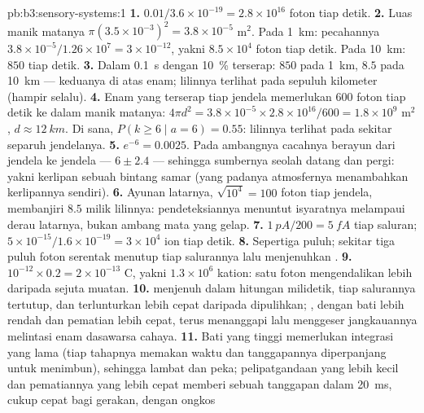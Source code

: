 \begin{solution}{pb:b3:sensory-systems:1}
\textbf{1.} $0.01/3.6\times 10^{-19} = 2.8\times 10^{16}$ foton tiap
detik.
\textbf{2.} Luas manik matanya $\pi(3.5\times 10^{-3})^{2} = 3.8\times 10^{-5}$
m$^{2}$. Pada \qty{1}{km}: pecahannya $3.8\times 10^{-5}/1.26\times 10^{7} =
3\times 10^{-12}$, yakni $8.5\times 10^{4}$ foton tiap detik. Pada \qty{10}{km}:
$850$ tiap detik.
\textbf{3.} Dalam \qty{0.1}{s} dengan \qty{10}{\%} terserap: $850$ pada
\qty{1}{km}, $8.5$ pada \qty{10}{km} --- keduanya di atas enam; lilinnya
terlihat pada sepuluh kilometer (hampir selalu).
\textbf{4.} Enam yang terserap tiap jendela memerlukan $600$ foton tiap detik ke dalam
manik matanya: $4\pi d^{2} = 3.8\times 10^{-5}\times 2.8\times 10^{16}/600
= 1.8\times 10^{9}$ m$^{2}$, $d \approx \qty{12}{km}$. Di sana, $P(k \ge
6 \mid a = 6) = 0.55$: lilinnya terlihat pada sekitar separuh jendelanya.
\textbf{5.} $e^{-6} = 0.0025$. Pada ambangnya cacahnya berayun dari
jendela ke jendela --- $6 \pm 2.4$ --- sehingga sumbernya seolah datang dan pergi:
yakni kerlipan sebuah bintang samar (yang padanya atmosfernya menambahkan
kerlipannya sendiri).
\textbf{6.} Ayunan latarnya, $\sqrt{10^{4}} = 100$ foton
tiap jendela, membanjiri $8.5$ milik lilinnya: pendeteksiannya menuntut isyaratnya
melampaui derau latarnya, bukan ambang mata yang gelap.
\textbf{7.} $\qty{1}{pA}/200 = \qty{5}{fA}$ tiap saluran; $5\times
10^{-15}/1.6\times 10^{-19} = 3\times 10^{4}$ ion tiap detik.
\textbf{8.} Sepertiga puluh; sekitar tiga puluh foton serentak menutup tiap
salurannya lalu menjenuhkan .
\textbf{9.} $10^{-12}\times 0.2 = 2\times 10^{-13}$ C, yakni $1.3\times 10^{6}$
kation: satu foton mengendalikan lebih daripada sejuta muatan.
\textbf{10.}  menjenuh dalam hitungan milidetik, tiap salurannya tertutup,
dan  terlunturkan lebih cepat daripada dipulihkan; ,
dengan bati lebih rendah dan pematian lebih cepat, terus menanggapi lalu menggeser
jangkauannya melintasi enam dasawarsa cahaya.
\textbf{11.} Bati yang tinggi memerlukan integrasi yang lama (tiap tahapnya memakan waktu dan
tanggapannya diperpanjang untuk menimbun), sehingga  lambat dan
peka; pelipatgandaan  yang lebih kecil dan pematiannya yang lebih cepat memberi sebuah
tanggapan dalam \qty{20}{ms}, cukup cepat bagi gerakan, dengan ongkos

\end{solution}
